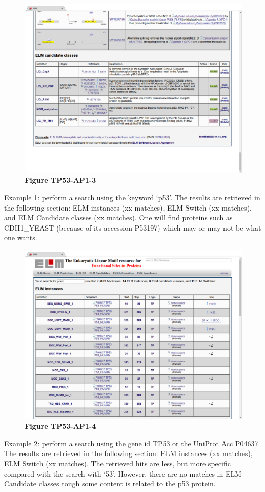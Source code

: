 \begin{figure}[h!]
\centering
\includegraphics[width=\textwidth]{Figures/TP53_3/TP53_candidates.png} 
\caption{
\textbf{Figure TP53-AP1-3}
}
\end{figure}

Example 1: perform a search using the keyword `p53'. The results are
retrieved in the following section: ELM instances (xx matches), ELM
Switch (xx matches), and ELM Candidate classes (xx matches). One will
find proteins such as CDH1\_YEAST (because of its accession P53197)
which may or may not be what one wants.

\begin{figure}[h!]
\centering
\includegraphics[width=\textwidth]{Figures/TP53_3/P04637_instances.png} 
\caption{
\textbf{Figure TP53-AP1-4}
}
\end{figure}

Example 2: perform a search using the gene id TP53 or the UniProt Acc
P04637. The results are retrieved in the following section: ELM
instances (xx matches), ELM Switch (xx matches). The retrieved hits are
less, but more specific compared with the search with `53'. However,
there are no matches in ELM Candidate classes tough some content is
related to the p53 protein.

